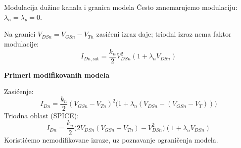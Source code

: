 \begin{frame}[label=09_1-s004]{Modulacija dužine kanala i granica modela}\setlength{\parskip}{2pt}\setlength{\abovedisplayskip}{4pt}\setlength{\belowdisplayskip}{4pt}\setlength{\abovedisplayshortskip}{3pt}\setlength{\belowdisplayshortskip}{3pt}
Često zanemarujemo modulaciju: $\lambda_n=\lambda_p=0$.\par Na granici $V_{DSn}=V_{GSn}-V_{Tn}$ zasićeni izraz daje; triodni izraz nema faktor modulacije:\[I_{Dn,\mathrm{sat}}=\frac{k_n}{2}V_{DSn}^2(1+\lambda_nV_{DSn})\]

\textbf{Primeri modifikovanih modela}\par Zasićenje:\[I_{Dn}=\frac{k_n}{2}(V_{GSn}-V_{Tn})^2\bigl(1+\lambda_n(V_{DSn}-(V_{GSn}-V_T))\bigr)\]
Triodna oblast (SPICE):\[I_{Dn}=\frac{k_n}{2}\bigl(2V_{DSn}(V_{GSn}-V_{Tn})-V_{DSn}^2\bigr)(1+\lambda_nV_{DSn})\]
\medskip\alert{Koristićemo nemodifikovane izraze, uz poznavanje ograničenja modela.}
\end{frame}
